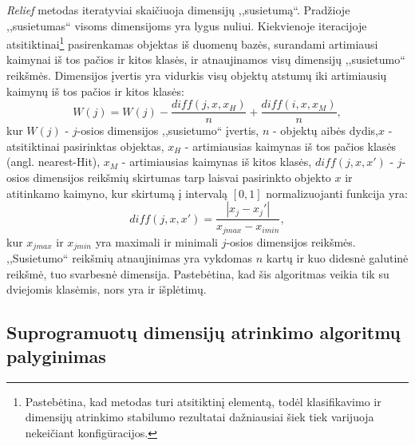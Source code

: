 \textit{Relief} metodas iteratyviai skaičiuoja dimensijų ,,susietumą``. Pradžioje
,,susietumas`` visoms dimensijoms yra lygus nuliui. Kiekvienoje
iteracijoje atsitiktinai\footnote{Pastebėtina, kad metodas 
turi atsitiktinį elementą, todėl klasifikavimo ir  dimensijų atrinkimo stabilumo
rezultatai dažniausiai šiek tiek varijuoja nekeičiant konfigūracijos.} 
pasirenkamas objektas iš duomenų bazės, surandami
artimiausi kaimynai iš tos pačios ir kitos klasės, ir atnaujinamos visų 
dimensijų ,,susietumo`` reikšmės. Dimensijos įvertis yra vidurkis visų objektų
atstumų iki artimiausių kaimynų iš tos pačios ir kitos klasės:
\begin{equation}
 W(j)=W(j) - \frac{diff(j, x, x_H)}{n} + \frac{diff(i, x, x_M)}{n},
\end{equation}
kur $W(j)$ - $j$-osios dimensijos ,,susietumo`` įvertis, $n$ - objektų aibės 
dydis,$x$ - atsitiktinai pasirinktas objektas, $x_H$ - artimiausias
kaimynas iš tos pačios klasės (angl. nearest-Hit), $x_M$ - artimiausias kaimynas
iš kitos klasės, $diff(j, x, x')$ - $j$-osios dimensijos reikšmių skirtumas
tarp laisvai pasirinkto objekto $x$ ir atitinkamo kaimyno, kur skirtumą į
intervalą $[0, 1]$ normalizuojanti funkcija yra:
\begin{equation}
 diff(j, x, x')=\frac{|x_j- x_j'|}{x_{j max} - x_{i min}},
\end{equation}
kur $x_{j max}$ ir $x_{j min}$ yra maximali ir minimali $j$-osios dimensijos
reikšmės. ,,Susietumo`` reikšmių atnaujinimas yra vykdomas $n$ kartų ir kuo
didesnė galutinė reikšmė, tuo svarbesnė dimensija. Pastebėtina, kad šis algoritmas
veikia tik su dviejomis klasėmis, nors yra ir išplėtimų.



\subsection{Suprogramuotų dimensijų atrinkimo algoritmų palyginimas}